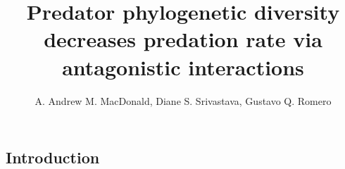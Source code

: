 \documentclass[10pt]{article}
\begin{document}
\title{Predator phylogenetic diversity decreases predation rate via
  antagonistic interactions} 
\author{A. Andrew M. MacDonald, Diane
  S. Srivastava, Gustavo Q. Romero}
\begin{spacing}{2}
\maketitle

\linenumbers

\section{Introduction}




\end{spacing}
\end{document}
